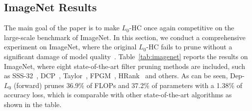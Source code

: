\documentclass[runningheads, envcountsame, a4paper]{llncs}
\begin{document}
\subsection{ImageNet Results}
The main goal of the paper is to make $L_0$-HC once again competitive on the large-scale benchmark of ImageNet. In this section, we conduct a comprehensive experiment on ImageNet, where the original $L_0$-HC fails to prune without a significant damage of model quality~\cite{gale2019state}. Table~\ref{tab:imagenet} reports the results on ImageNet, where eight state-of-the-art filter pruning methods are included, such as SSS-32~\cite{huang2018data}, DCP~\cite{zhuang2018discrimination}, Taylor~\cite{molchanov2019importance}, FPGM~\cite{he2019filter}, HRank~\cite{lin2020hrank} and others. As can be seen, Dep-$L_0$ (forward) prunes 36.9\% of FLOPs and 37.2\% of parameters with a 1.38\% of accuracy loss, which is comparable with other state-of-the-art algorithms as shown in the table. 
\end{document}
